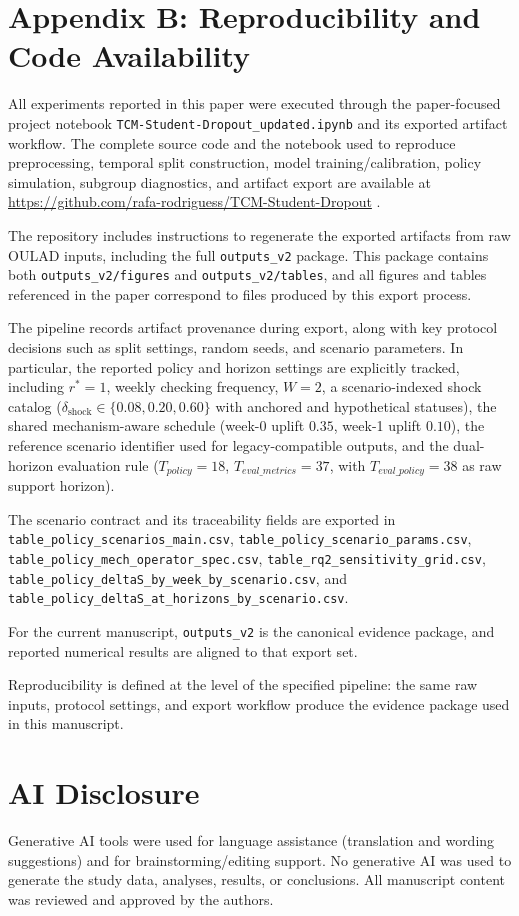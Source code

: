 \section{Appendix B: Reproducibility and Code Availability}
\label{app:b}

All experiments reported in this paper were executed through the paper-focused project notebook
\texttt{TCM-Student-Dropout\_updated.ipynb} and its exported artifact workflow.
The complete source code and the notebook used to reproduce preprocessing,
temporal split construction, model training/calibration,
policy simulation, subgroup diagnostics, and artifact export are available at
\url{https://github.com/rafa-rodriguess/TCM-Student-Dropout}
\cite{RafaRepoTCMStudentDropout}.

The repository includes instructions to regenerate the exported artifacts
from raw OULAD inputs, including the full \texttt{outputs\_v2} package.
This package contains both \texttt{outputs\_v2/figures} and
\texttt{outputs\_v2/tables}, and all figures and tables referenced in the paper
correspond to files produced by this export process.

The pipeline records artifact provenance during export,
along with key protocol decisions such as split settings,
random seeds, and scenario parameters.
In particular, the reported policy and horizon settings are explicitly tracked,
including $r^*=1$, weekly checking frequency, $W=2$,
a scenario-indexed shock catalog ($\delta_{\mathrm{shock}}\in\{0.08,0.20,0.60\}$ with anchored and hypothetical statuses),
the shared mechanism-aware schedule (week-0 uplift $0.35$, week-1 uplift $0.10$),
the reference scenario identifier used for legacy-compatible outputs,
and the dual-horizon evaluation rule
($T_{policy}=18$, $T_{eval\_metrics}=37$, with
$T_{eval\_policy}=38$ as raw support horizon).

The scenario contract and its traceability fields are exported in
\nolinkurl{table_policy_scenarios_main.csv},
\nolinkurl{table_policy_scenario_params.csv},
\nolinkurl{table_policy_mech_operator_spec.csv},
\nolinkurl{table_rq2_sensitivity_grid.csv},
\nolinkurl{table_policy_deltaS_by_week_by_scenario.csv}, and
\nolinkurl{table_policy_deltaS_at_horizons_by_scenario.csv}.

For the current manuscript, \texttt{outputs\_v2} is the canonical evidence package, and reported numerical results are aligned to that export set.

Reproducibility is defined at the level of the specified pipeline: the same raw inputs, protocol settings, and export workflow produce the evidence package used in this manuscript.

\section*{AI Disclosure}
Generative AI tools were used for language assistance (translation and wording
suggestions) and for brainstorming/editing support.
No generative AI was used to generate the study data, analyses,
results, or conclusions.
All manuscript content was reviewed and approved by the authors.
